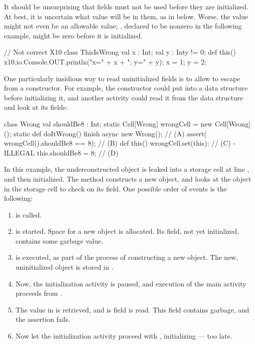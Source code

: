 It should be unsurprising that fields must not be used before they are
initialized. At best, it is uncertain what value will be in them, as in
 below. Worse, the value might not even be an allowable value; ,
declared to be nonzero in the following example, might be zero before it is
initialized.
\begin{xten}
// Not correct X10
class ThisIsWrong {
  val x : Int;
  val y : Int{y != 0};
  def this() {
    x10.io.Console.OUT.println("x=" + x + "; y=" + y);
    x = 1; y = 2;
  }
}
\end{xten}

One particularly insidious way to read uninitialized fields is to allow
 to escape from a constructor. For example, the constructor could
put  into a data structure before initializing it, and another
activity could read it from the data structure and look at its fields:
\begin{xten}
class Wrong {
  val shouldBe8 : Int;
  static Cell[Wrong] wrongCell = new Cell[Wrong]();
  static def doItWrong() {
     finish {
       async { new Wrong(); } // (A)
       assert( wrongCell().shouldBe8 == 8); // (B)
     }
  }
  def this() {
     wrongCell.set(this); // (C) - ILLEGAL
     this.shouldBe8 = 8; // (D)
  }
}
\end{xten}
\noindent
In this example, the underconstructed  object is leaked into a
storage cell at line , and then initialized.  The 
method constructs a new  object, and looks at the 
object in the storage cell to check on its  field.  One
possible order of events is the following:
\begin{enumerate}
\item {} is called.
\item {} is started.  Space for a new  object is allocated.
      Its  field, not yet initialized, contains some garbage
      value.
\item {} is executed, as part of the process of constructing a new
       object.  The new, uninitialized object is stored in
      .
\item Now, the initialization activity is paused, and execution of the main activity
      proceeds from .
\item The value in  is retrieved, and is  field
      is read.  This field contains garbage, and the assertion fails.
\item Now let the initialization activity proceed with ,
      initializing  --- too late.
\end{enumerate}

